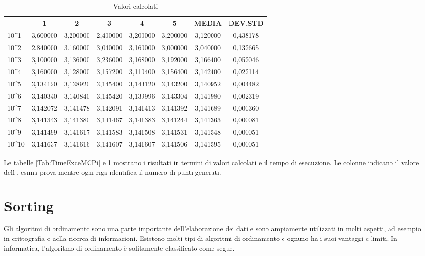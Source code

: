 \documentclass[12pt,a4paper]{report}
\begin{document}
\begin{table}[ht]
\begin{tabular}{|l|c|c|c|c|c|c|c|}
\hline
               & 1        & 2        & 3        & 4        & 5        & MEDIA    & DEV.STD  \\ \hline
10\textasciicircum{}1  & 3,600000 & 3,200000 & 2,400000 & 3,200000 & 3,200000 & 3,120000 & 0,438178 \\ \hline
10\textasciicircum{}2  & 2,840000 & 3,160000 & 3,040000 & 3,160000 & 3,000000 & 3,040000 & 0,132665 \\ \hline
10\textasciicircum{}3  & 3,100000 & 3,136000 & 3,236000 & 3,168000 & 3,192000 & 3,166400 & 0,052046 \\ \hline
10\textasciicircum{}4  & 3,160000 & 3,128000 & 3,157200 & 3,110400 & 3,156400 & 3,142400 & 0,022114 \\ \hline
10\textasciicircum{}5  & 3,134120 & 3,138920 & 3,145400 & 3,143120 & 3,143200 & 3,140952 & 0,004482 \\ \hline
10\textasciicircum{}6  & 3,140340 & 3,140840 & 3,145420 & 3,139996 & 3,143304 & 3,141980 & 0,002319 \\ \hline
10\textasciicircum{}7  & 3,142072 & 3,141478 & 3,142091 & 3,141413 & 3,141392 & 3,141689 & 0,000360 \\ \hline
10\textasciicircum{}8  & 3,141343 & 3,141380 & 3,141467 & 3,141383 & 3,141244 & 3,141363 & 0,000081 \\ \hline
10\textasciicircum{}9  & 3,141499 & 3,141617 & 3,141583 & 3,141508 & 3,141531 & 3,141548 & 0,000051 \\ \hline
10\textasciicircum{}10 & 3,141637 & 3,141616 & 3,141607 & 3,141607 & 3,141506 & 3,141595 & 0,000051 \\ \hline
\end{tabular}
\caption{Valori calcolati}
\label{Tab:ValueMCPi}
\end{table}

Le tabelle \ref{Tab:TimeExceMCPi} e \ref{Tab:ValueMCPi} mostrano i risultati in termini di valori calcolati e il tempo di esecuzione.  Le colonne indicano il valore dell i-esima prova mentre ogni riga identifica il numero di punti generati.

\section{Sorting}
Gli algoritmi di ordinamento sono una parte importante dell'elaborazione dei dati e sono ampiamente utilizzati in molti aspetti, ad esempio in crittografia e nella ricerca di informazioni. Esistono molti tipi di algoritmi di ordinamento e ognuno ha i suoi vantaggi e limiti. In informatica, l'algoritmo di ordinamento è solitamente classificato come segue.
\end{document}
